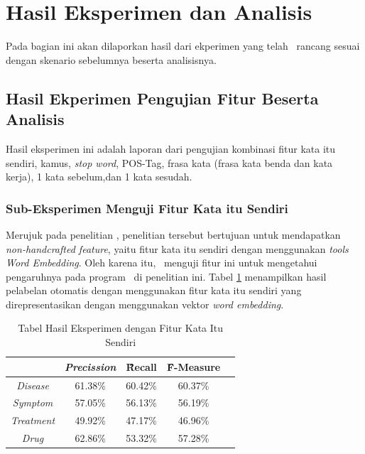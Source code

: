 \section{Hasil Eksperimen dan Analisis}
Pada bagian ini akan dilaporkan hasil dari ekperimen yang telah \saya~rancang sesuai dengan skenario sebelumnya beserta analisisnya. 
	\subsection{Hasil Ekperimen Pengujian Fitur Beserta Analisis}
	
	Hasil eksperimen ini adalah laporan dari pengujian kombinasi fitur kata itu sendiri, kamus, \textit{stop word}, POS-Tag, frasa kata (frasa kata benda dan kata kerja), 1 kata sebelum,dan 1 kata sesudah.
	  
	\subsubsection{Sub-Eksperimen Menguji Fitur Kata itu Sendiri}
	Merujuk pada penelitian \cite{mujiono2016new}, penelitian tersebut bertujuan untuk mendapatkan \textit{non-handcrafted feature}, yaitu fitur kata itu sendiri dengan menggunakan \textit{tools Word Embedding}. Oleh karena itu, \saya~menguji fitur ini untuk mengetahui pengaruhnya pada program \mer~di penelitian ini. Tabel \ref{table:own1} menampilkan hasil pelabelan otomatis dengan menggunakan fitur kata itu sendiri yang direpresentasikan dengan menggunakan vektor \textit{word embedding}.
	
	\begin{table}
	    \centering
	    \caption{Tabel Hasil Eksperimen dengan Fitur Kata Itu Sendiri}
	    \begin{tabular}{|c|c|c|c|c|}
	      \hline
						      & \textit{Precission} & \f{\f{Recall}} & \f{\f{F-Measure}} \\ \hline
	      \textit{Disease}    & 61.38\%             & 60.42\%        & 60.37\%           \\ \hline
	      \textit{Symptom}    & 57.05\%             & 56.13\%        & 56.19\%           \\ \hline
	      \textit{Treatment}  & 49.92\%             & 47.17\%        & 46.96\%           \\ \hline
	      \textit{Drug}		  & 62.86\%             & 53.32\%        & 57.28\%           \\ \hline
	    \end{tabular}
	    \label{table:own1}
	\end{table}
	
